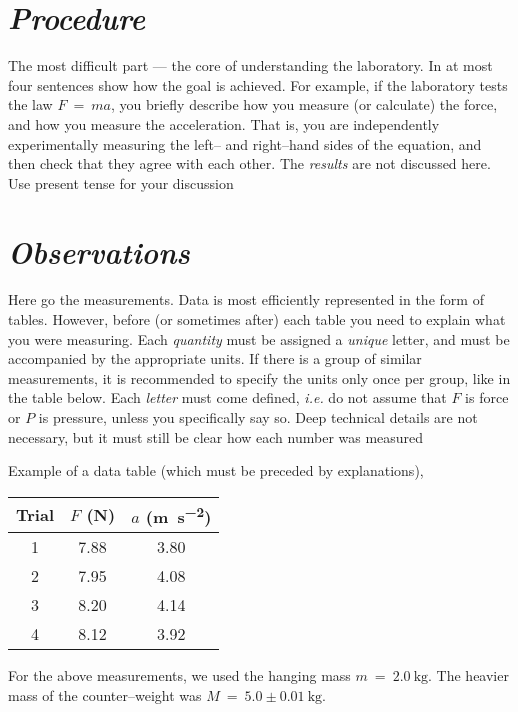 \documentclass[epsfig,12pt]{article}
\begin{document}
\section*{\textit{Procedure}}

	The most difficult part --- the core of understanding the laboratory.
	In at most four sentences show how the goal is achieved.
	For example, if the laboratory tests the law $ F ~=~ m a $,
	you briefly describe how you measure (or calculate) the force,
	and how you measure the acceleration.
	That is, you are independently experimentally measuring the left-- and right--hand sides 
	of the equation, and then check that they agree with each other.
	The \emph{results} are not discussed here.
	Use present tense for your discussion
	

\section*{\textit{Observations}}

	Here go the measurements.
	Data is most efficiently represented in the form of tables.
	However, before (or sometimes after) each table you need to explain what you were measuring.
	Each \emph{quantity} must be assigned a \emph{unique} letter, and must be accompanied by
	the appropriate units.
	If there is a group of similar measurements, it is recommended to specify the units
	only once per group, like in the table below.
	Each \emph{letter} must come defined, \emph{i.e.} do not assume that $ F $ is force or $ P $ is pressure,
	unless you specifically say so.
	Deep technical details are not necessary,
	but it must still be clear how each number was measured
	
\bigskip\noindent
	Example of a data table (which must be preceded by explanations),
\begin{center}
\begin{tabular}{ccc}
%
\toprule
%
	Trial	&	$ F $ (\si{\newton})	&	$ a $ (\si{\metre\per\square\second})	\\[2mm]
%
\midrule
%
	1	&	7.88	&	3.80	\\[2mm]
	2	&	7.95	&	4.08	\\[2mm]
	3	&	8.20	&	4.14	\\[2mm]
	4	&	8.12	&	3.92	\\[2mm]
%
\bottomrule
\end{tabular}
\end{center}
	For the above measurements, we used the hanging mass $ m ~=~ \SI{2.0}{\kg} $.
	The heavier mass of the counter--weight was $ M ~=~ 5.0 \pm \SI{0.01}{\kg} $.
\end{document}
